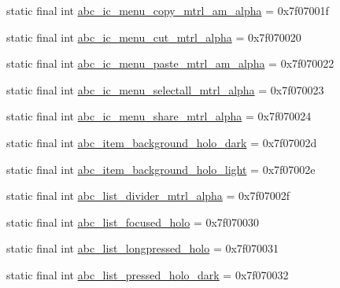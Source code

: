 \begin{DoxyCompactItemize}
\item 
static final int \mbox{\hyperlink{classcom_1_1google_1_1android_1_1gms_1_1R_1_1drawable_ae06f0806928b304420ce6b345a0b04d1}{abc\+\_\+ic\+\_\+menu\+\_\+copy\+\_\+mtrl\+\_\+am\+\_\+alpha}} = 0x7f07001f
\item 
static final int \mbox{\hyperlink{classcom_1_1google_1_1android_1_1gms_1_1R_1_1drawable_aae5436396f458f9aa2313466f497b519}{abc\+\_\+ic\+\_\+menu\+\_\+cut\+\_\+mtrl\+\_\+alpha}} = 0x7f070020
\item 
static final int \mbox{\hyperlink{classcom_1_1google_1_1android_1_1gms_1_1R_1_1drawable_a688cff4bfaf12faa2f8e38f03fccb541}{abc\+\_\+ic\+\_\+menu\+\_\+paste\+\_\+mtrl\+\_\+am\+\_\+alpha}} = 0x7f070022
\item 
static final int \mbox{\hyperlink{classcom_1_1google_1_1android_1_1gms_1_1R_1_1drawable_a737c3c5b922093774ef4545538bcf379}{abc\+\_\+ic\+\_\+menu\+\_\+selectall\+\_\+mtrl\+\_\+alpha}} = 0x7f070023
\item 
static final int \mbox{\hyperlink{classcom_1_1google_1_1android_1_1gms_1_1R_1_1drawable_a530e92ad4171aea2d22772f0e1b9bcd2}{abc\+\_\+ic\+\_\+menu\+\_\+share\+\_\+mtrl\+\_\+alpha}} = 0x7f070024
\item 
static final int \mbox{\hyperlink{classcom_1_1google_1_1android_1_1gms_1_1R_1_1drawable_adcbac5cfad727c2f3419b8cc7c09336c}{abc\+\_\+item\+\_\+background\+\_\+holo\+\_\+dark}} = 0x7f07002d
\item 
static final int \mbox{\hyperlink{classcom_1_1google_1_1android_1_1gms_1_1R_1_1drawable_a34ece6aa3278f61114874b704005ad90}{abc\+\_\+item\+\_\+background\+\_\+holo\+\_\+light}} = 0x7f07002e
\item 
static final int \mbox{\hyperlink{classcom_1_1google_1_1android_1_1gms_1_1R_1_1drawable_a64f652bc7d731b44aea7d1b471e79872}{abc\+\_\+list\+\_\+divider\+\_\+mtrl\+\_\+alpha}} = 0x7f07002f
\item 
static final int \mbox{\hyperlink{classcom_1_1google_1_1android_1_1gms_1_1R_1_1drawable_a7841c396c6a204e564204176c4f6c4f4}{abc\+\_\+list\+\_\+focused\+\_\+holo}} = 0x7f070030
\item 
static final int \mbox{\hyperlink{classcom_1_1google_1_1android_1_1gms_1_1R_1_1drawable_a95dcf7d2f4ecdf66eda9d49e127f648b}{abc\+\_\+list\+\_\+longpressed\+\_\+holo}} = 0x7f070031
\item 
static final int \mbox{\hyperlink{classcom_1_1google_1_1android_1_1gms_1_1R_1_1drawable_ad2f78b8c5859b18ed61eba201f5d3899}{abc\+\_\+list\+\_\+pressed\+\_\+holo\+\_\+dark}} = 0x7f070032
\item 

\end{DoxyCompactItemize}
